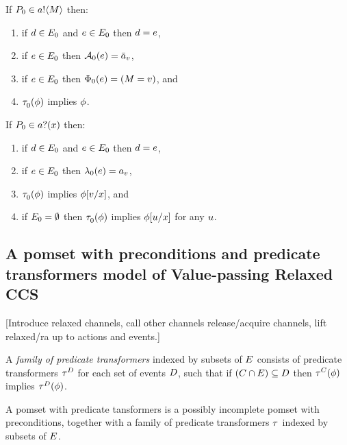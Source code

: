 \begin{definition}
  If $\aPS_0 \in \sSEND\aChan{\aExp}$ then:
  \begin{enumerate}
  \item if $\bEv\in\aEvs_0$ and $\aEv\in\aEvs_0$ then $\bEv=\aEv$,
  \item if $\aEv\in\aEvs_0$ then $\labelingAct_0(\aEv) = \send\aChan{\aVal}$,
  \item if $\aEv\in\aEvs_0$ then $\labelingForm_0(\aEv) = (M = v)$, and
  \item $\aTr_0(\aForm)$ implies $\aForm$.
  \end{enumerate}
\end{definition}

\begin{definition}
  If $\aPS_0 \in \sRECV\aChan{\aVar}$ then:
  \begin{enumerate}
  \item if $\bEv\in\aEvs_0$ and $\aEv\in\aEvs_0$ then $\bEv=\aEv$,
  \item if $\aEv\in\aEvs_0$ then $\labeling_0(\aEv) = \recv\aChan{\aVal}$,
  \item $\aTr_0(\aForm)$ implies $\phi[\aVal/\aVar]$, and
  \item if $\aEvs_0=\emptyset$ then $\aTr_0(\aForm)$ implies $\phi[\bVal/\aVar]$ for any $\bVal$.
  \end{enumerate}
\end{definition}

\subsection{A pomset with preconditions and predicate transformers model of Value-passing Relaxed CCS}

[Introduce relaxed channels, call other channels release/acquire channels, lift relaxed/ra up to actions and events.]

\begin{definition}
  A \emph{family of predicate transformers}
  indexed by subsets of $\aEvs$
  consists of predicate transformers
  $\aTr[\bEvs]$ for each set of events $\bEvs$,
  such that if $(\cEvs\cap\aEvs) \subseteq \bEvs$
  then $\aTr[\cEvs](\aForm)$ implies $\aTr[\bEvs](\aForm)$.
\end{definition}

\begin{definition}
  A pomset with predicate tansformers is a possibly incomplete
  pomset with preconditions, together with a family of predicate transformers $\aTr$
  indexed by subsets of $\aEvs$.
\end{definition}

